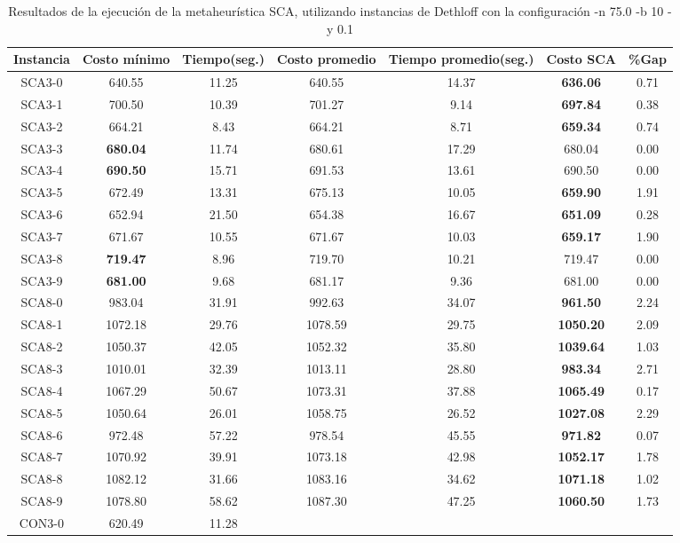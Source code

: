 \begin{table}[ht]
\caption{Resultados de la ejecución de la metaheurística SCA, utilizando instancias de Dethloff con la configuración -n 75.0 -b 10 -y 0.1}
\centering
\small
\begin{tabular}{c c c c c c c}
\hline\hline
Instancia & Costo mínimo & Tiempo(seg.) & Costo promedio & Tiempo promedio(seg.) & Costo SCA & \%Gap \\ [0.5ex]
\hline
SCA3-0 & 640.55 & 11.25 & 
640.55 & 14.37 & \bf{636.06} & 
0.71\\SCA3-1 & 700.50 & 10.39 & 
701.27 & 9.14 & \bf{697.84} & 
0.38\\SCA3-2 & 664.21 & 8.43 & 
664.21 & 8.71 & \bf{659.34} & 
0.74\\SCA3-3 & \bf{680.04} & 11.74 & 
680.61 & 17.29 & 680.04 & 0.00\\
SCA3-4 & \bf{690.50} & 15.71 & 
691.53 & 13.61 & 690.50 & 0.00\\
SCA3-5 & 672.49 & 13.31 & 
675.13 & 10.05 & \bf{659.90} & 
1.91\\SCA3-6 & 652.94 & 21.50 & 
654.38 & 16.67 & \bf{651.09} & 
0.28\\SCA3-7 & 671.67 & 10.55 & 
671.67 & 10.03 & \bf{659.17} & 
1.90\\SCA3-8 & \bf{719.47} & 8.96 & 
719.70 & 10.21 & 719.47 & 0.00\\
SCA3-9 & \bf{681.00} & 9.68 & 
681.17 & 9.36 & 681.00 & 0.00\\
SCA8-0 & 983.04 & 31.91 & 
992.63 & 34.07 & \bf{961.50} & 
2.24\\SCA8-1 & 1072.18 & 29.76 & 
1078.59 & 29.75 & \bf{1050.20} & 
2.09\\SCA8-2 & 1050.37 & 42.05 & 
1052.32 & 35.80 & \bf{1039.64} & 
1.03\\SCA8-3 & 1010.01 & 32.39 & 
1013.11 & 28.80 & \bf{983.34} & 
2.71\\SCA8-4 & 1067.29 & 50.67 & 
1073.31 & 37.88 & \bf{1065.49} & 
0.17\\SCA8-5 & 1050.64 & 26.01 & 
1058.75 & 26.52 & \bf{1027.08} & 
2.29\\SCA8-6 & 972.48 & 57.22 & 
978.54 & 45.55 & \bf{971.82} & 
0.07\\SCA8-7 & 1070.92 & 39.91 & 
1073.18 & 42.98 & \bf{1052.17} & 
1.78\\SCA8-8 & 1082.12 & 31.66 & 
1083.16 & 34.62 & \bf{1071.18} & 
1.02\\SCA8-9 & 1078.80 & 58.62 & 
1087.30 & 47.25 & \bf{1060.50} & 
1.73\\CON3-0 & 620.49 & 11.28 & 

\end{tabular}
\end{table}
